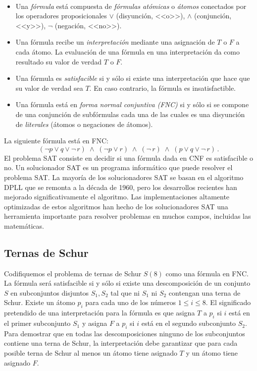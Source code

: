 \begin{definition}\label{def.sat}\mbox{}\\
\begin{itemize}
\item Una \emph{fórmula} está compuesta de \emph{fórmulas atómicas} o \emph{átomos} conectados por los operadores proposicionales $\vee$ (disyunción, <<o>>), $\wedge$ (conjunción, <<y>>), $\neg$ (negación, <<no>>).
\item Una fórmula recibe un \emph{interpretación} mediante una asignación de $T$ o $F$ a cada átomo. La evaluación de una fórmula en una interpretación da como resultado su valor de verdad $T$ o $F$. 
\item Una fórmula es \emph{satisfacible} si y sólo si existe una interpretación que hace que su valor de verdad sea $T$. En caso contrario, la fórmula es insatisfactible.
\item Una fórmula está en \emph{forma normal conjuntiva (FNC)} si y sólo si se compone de una conjunción de subfórmulas cada una de las cuales es una disyunción de \emph{literales} (átomos o negaciones de átomos).
\end{itemize}
\end{definition}

La siguiente fórmula está en FNC:
\[
(\neg p \vee q \vee \neg \,r) \;\wedge\; (\neg p \vee r)
\;\wedge\; (\neg \,r)\;\wedge\;(p \vee q \vee \neg \,r)\,.
\]
El problema SAT consiste en decidir si una fórmula dada en CNF es satisfacible o no. Un solucionador SAT es un programa informático que puede resolver el problema SAT. La mayoría de los solucionadores SAT se basan en el algoritmo DPLL que se remonta a la década de 1960, pero los desarrollos recientes han mejorado significativamente el algoritmo. Las implementaciones altamente optimizadas de estos algoritmos han hecho de los solucionadores SAT una herramienta importante para resolver problemas en muchos campos, incluidas las matemáticas.

\subsection{Ternas de Schur}

Codifiquemos el problema de ternas de Schur $S(8)$ como una fórmula en FNC. La fórmula será satisfacible si y sólo si existe una descomposición de un conjunto $S$ en subconjuntos disjuntos $S_1,S_2$ tal que ni $S_1$ ni $S_2$ contengan una terna de Schur. Existe un átomo $p_i$ para cada uno de los números $1\leq i \leq 8$. El significado pretendido de una interpretación para la fórmula es que asigna $T$ a $p_i$ si $i$ está en el primer subconjunto $S_1$ y asigna $F$ a $p_i$ si $i$ está en el segundo subconjunto $S_2$. Para demostrar que en todas las descomposiciones ninguno de los subconjuntos contiene una terna de Schur, la interpretación debe garantizar que para cada posible terna de Schur al menos un átomo tiene asignado $T$ y un átomo tiene asignado $F$. 

